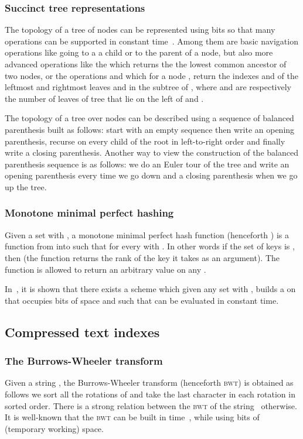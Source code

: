 \documentclass[a4paper]{article}
\begin{document}
\subsubsection{Succinct tree representations}
The topology of a tree of  nodes can be represented using  bits so that 
many operations can be supported in constant time~\cite{NStalg14}. Among them are basic 
navigation operations like going to a a child or to the parent of a node, but also more 
advanced operations like the  which returns the 
the lowest common ancestor of two nodes, or the operations  and 
 which for a node , return the indexes  and  
of the leftmost and rightmost leaves  and 
in the subtree of , where  and  are respectively
the number of leaves of tree that lie on the left of  and . 
 
The topology of a tree over  nodes can be described using a sequence 
of  balanced parenthesis built as follows: start 
with an empty sequence then write an opening parenthesis, 
recurse on every child of the root in left-to-right order 
and finally write a closing parenthesis. Another way to view 
the construction of the balanced parenthesis sequence is as 
follows: we do an Euler tour of the tree and write an opening 
parenthesis every time we go down and a closing parenthesis 
when we go up the tree. 

\subsubsection{Monotone minimal perfect hashing}
Given a set  with , a 
monotone minimal perfect hash function (henceforth )
is a function  from  into  such that 
for every  with . In other words 
if the set of keys  is , 
then  (the function returns the rank 
of the key it takes as an argument).  
The function is allowed 
to return an arbitrary value on any . 

In~\cite{BBPV09}, it is shown that there exists a scheme which given 
any set  with , builds 
a  on  that occupies 
bits of space and such that  can be evaluated in constant time. 



\subsection{Compressed text indexes}
\label{sec:compressed_text_idx}
\subsubsection{The Burrows-Wheeler transform}
Given a string , the Burrows-Wheeler transform (henceforth \textsc{bwt}) is obtained as follows
we sort all the  rotations of  and take the last character in each rotation in sorted order. 
There is a strong relation between the \textsc{bwt} of the string \sigma\ otherwise. 
It is well-known that the \textsc{bwt} can be built in  time~\cite{HSS09}, while using  bits of (temporary working) space. 
\end{document}
